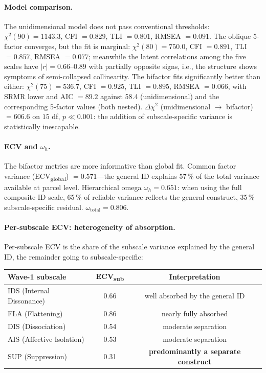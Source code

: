 \paragraph{Model comparison.} The unidimensional model does not pass conventional thresholds: $\chi^2(90) = 1143.3$, CFI $= 0.829$, TLI $= 0.801$, RMSEA $= 0.091$. The oblique 5-factor converges, but the fit is marginal: $\chi^2(80) = 750.0$, CFI $= 0.891$, TLI $= 0.857$, RMSEA $= 0.077$; meanwhile the latent correlations among the five scales have $|r| = 0.66$--$0.89$ with partially opposite signs, i.e., the structure shows symptoms of semi-collapsed collinearity. The bifactor fits significantly better than either: $\chi^2(75) = 536.7$, CFI $= 0.925$, TLI $= 0.895$, RMSEA $= 0.066$, with SRMR lower and AIC $= 89.2$ against 58.4 (unidimensional) and the corresponding 5-factor values (both nested). $\Delta\chi^2$ (unidimensional $\to$ bifactor) $= 606.6$ on $15$ df, $p \ll 0.001$: the addition of subscale-specific variance is statistically inescapable.

\paragraph{ECV and $\omega_h$.} The bifactor metrics are more informative than global fit. Common factor variance (ECV\textsubscript{global}) $= 0.571$---the general ID explains 57\,\% of the total variance available at parcel level. Hierarchical omega $\omega_h = 0.651$: when using the full composite ID scale, 65\,\% of reliable variance reflects the general construct, 35\,\% subscale-specific residual. $\omega_{\text{total}} = 0.806$.

\paragraph{Per-subscale ECV: heterogeneity of absorption.} Per-subscale ECV is the share of the subscale variance explained by the general ID, the remainder going to subscale-specific:

\begin{center}
\begin{tabular}{lcc}
\hline
Wave-1 subscale & ECV\textsubscript{sub} & Interpretation \\
\hline
IDS (Internal Dissonance) & 0.66 & well absorbed by the general ID \\
FLA (Flattening) & 0.86 & nearly fully absorbed \\
DIS (Dissociation) & 0.54 & moderate separation \\
AIS (Affective Isolation) & 0.53 & moderate separation \\
SUP (Suppression) & 0.31 & \textbf{predominantly a separate construct} \\
\hline
\end{tabular}
\end{center}


